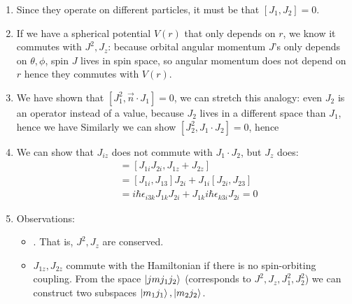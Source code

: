 \documentclass{school-22.101-notes}
\begin{document}
\begin{enumerate}
\item Since they operate on different particles, it must be that $[J_1, J_2] = 0$. 

\item If we have a spherical potential $V(r)$ that only depends on $r$, we know it commutes with $J^2, J_z$: 
because orbital angular momentum $J$'s only depends on $\theta, \phi$, spin $J$ lives in spin space, so angular momentum does not depend on $r$ hence they commutes with $V(r)$. 

\item We have shown that $[J_1^2, \vec{n} \cdot J_1] = 0$, we can stretch this analogy: even $J_2$ is an operator instead of a value, because $J_2$ lives in a different space than $J_1$, hence we have 
  Similarly we can show $[J_2^2, J_1 \cdot J_2] = 0$, hence 

\item We can show that $J_{iz}$ does not commute with $J_1 \cdot J_2$, but $J_z$ does: 
  \begin{align}
    [J_1 \cdot J_2, J_z] &= [J_{1i} J_{2i}, J_{1z} + J_{2z}] \\
    &= [J_{1i}, J_{13}] J_{2i} + J_{1i} [J_{2i}, J_{23}] \\
    &= i \hbar \epsilon_{i3k} J_{1k} J_{2i} + J_{1k} i \hbar \epsilon_{k3i} J_{2i} = 0 
  \end{align}

\item Observations: 
  \begin{itemize}
  \item {}. That is, $J^2, J_z$ are conserved. 

  \item $J_{1z}, J_{2z}$ commute with the Hamiltonian if there is no spin-orbiting coupling. From the space $\left| j m j_1 j_2 \right>$ (corresponds to $J^2, J_z, J_1^2, J_2^2$) we can construct two subspaces $\left| m_1 j_1 \right>, \left| m_2 j_2 \right>$. 


\end{itemize}
\end{enumerate}
\end{document}
